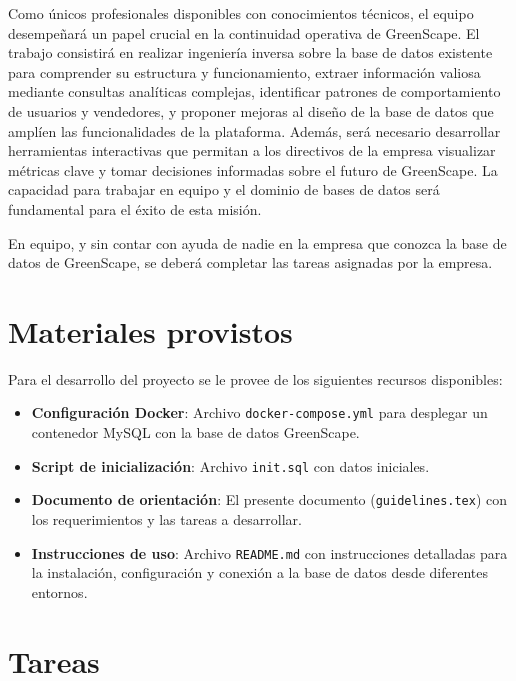\documentclass[10pt]{article}
\begin{document}
	Como únicos profesionales disponibles con conocimientos técnicos, el equipo desempeñará un papel crucial en la continuidad operativa de GreenScape. El trabajo consistirá en realizar ingeniería inversa sobre la base de datos existente para comprender su estructura y funcionamiento, extraer información valiosa mediante consultas analíticas complejas, identificar patrones de comportamiento de usuarios y vendedores, y proponer mejoras al diseño de la base de datos que amplíen las funcionalidades de la plataforma. Además, será necesario desarrollar herramientas interactivas que permitan a los directivos de la empresa visualizar métricas clave y tomar decisiones informadas sobre el futuro de GreenScape. La capacidad para trabajar en equipo y el dominio de bases de datos será fundamental para el éxito de esta misión.

	En equipo, y sin contar con ayuda de nadie en la empresa que conozca la base de datos de GreenScape, se deberá completar las tareas asignadas por la empresa.

	\section*{Materiales provistos}

	Para el desarrollo del proyecto se le provee de los siguientes recursos disponibles:

	\begin{itemize}
		\item \textbf{Configuración Docker}: Archivo \texttt{docker-compose.yml} para desplegar un contenedor MySQL con la base de datos GreenScape.

		\item \textbf{Script de inicialización}: Archivo \texttt{init.sql} con datos iniciales.

		\item \textbf{Documento de orientación}: El presente documento (\texttt{guidelines.tex}) con los requerimientos y las tareas a desarrollar.

		\item \textbf{Instrucciones de uso}: Archivo \texttt{README.md} con instrucciones detalladas para la instalación, configuración y conexión a la base de datos desde diferentes entornos.
	\end{itemize}

	\section*{Tareas}
\end{document}
